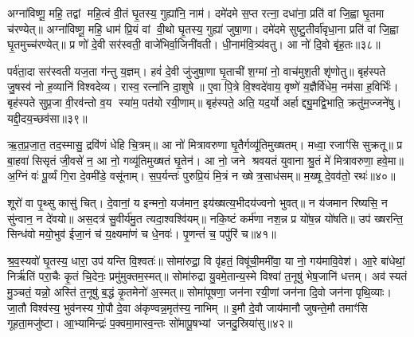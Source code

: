 अग्ना॑विष्णू॒ महि॒ तद्वां महि॒त्वं वी॒तं घृ॒तस्य॒ गुह्या॑नि॒ नाम॑। दमे॑दमे स॒प्त रत्ना॒ दधा॑ना॒ प्रति॑ वां जि॒ह्वा घृ॒तमा च॑रण्येत्॥ अग्ना॑विष्णू॒ महि॒ धाम॑ प्रि॒यं वां वी॒थो घृ॒तस्य॒ गुह्या॑ जुषा॒णा। दमे॑दमे सुष्टु॒तीर्वा॑वृधा॒ना प्रति॑ वां जि॒ह्वा घृ॒तमुच्च॑रण्येत्॥ प्र णो॑ दे॒वी सर॑स्वती॒ वाजे॑भिर्वा॒जिनी॑वती। धी॒नाम॑वि॒त्र्य॑वतु। आ नो॑ दि॒वो बृ॑ह॒तः॥३८॥

पर्व॑ता॒दा सर॑स्वती यज॒ता ग॑न्तु य॒ज्ञम्। हवं॑ दे॒वी जु॑जुषा॒णा घृ॒ताची॑ श॒ग्मां नो॒ वाच॑मुश॒ती शृ॑णोतु॥ बृह॑स्पते जु॒षस्व॑ नो ह॒व्यानि॑ विश्वदेव्य। रास्व॒ रत्ना॑नि दा॒शुषे॥ ए॒वा पि॒त्रे वि॒श्वदे॑वाय॒ वृष्णे॑ य॒ज्ञैर्वि॑धेम॒ नम॑सा ह॒विर्भिः॑। बृह॑स्पते सुप्र॒जा वी॒रव॑न्तो व॒य स्या॑म॒ पत॑यो रयी॒णाम्॥ बृह॑स्पते॒ अति॒ यद॒र्यो अर्\mbox{}हाद्द्यु॒मद्वि॒भाति॒ क्रतु॑म॒ज्जने॑षु। यद्दी॒दय॒च्छव॑सा॥३९॥

ऋ॒त॒प्र॒जा॒त॒ तद॒स्मासु॒ द्रवि॑णं धेहि चि॒त्रम्॥ आ नो॑ मित्रावरुणा घृ॒तैर्गव्यू॑तिमुख्षतम्। मध्वा॒ रजाꣳ॑सि सुक्रतू॥ प्र बा॒हवा॑ सिसृतं जी॒वसे॑ न॒ आ नो॒ गव्यू॑तिमुख्षतं घृ॒तेन॑। आ नो॒ जने श्रवयतं युवाना श्रु॒तं मे॑ मित्रावरुणा॒ हवे॒मा॥ अ॒ग्निं वः॑ पू॒र्व्यं गि॒रा दे॒वमी॑डे॒ वसू॑नाम्। स॒प॒र्यन्तः॑ पुरुप्रि॒यं मि॒त्रं न ख्षेत्र॒साध॑सम्॥ म॒ख्षू दे॒वव॑तो॒ रथः॑॥४०॥

शूरो॑ वा पृ॒थ्सु कासु॑ चित्। दे॒वानां॒ य इन्मनो॒ यज॑मान॒ इय॑ख्षत्य॒भीदय॑ज्वनो भुवत्॥ न य॑जमान रिष्यसि॒ न सु॑न्वान॒ न दे॑वयो॥ अस॒दत्र॑ सु॒वीर्य॑मु॒त त्यदा॒श्वश्वि॑यम्॥ नकि॒ष्टं कर्म॑णा नश॒न्न प्र यो॑ष॒न्न यो॑षति॥ उप॑ ख्षरन्ति॒ सिन्ध॑वो मयो॒भुव॑ ईजा॒नं च॑ य॒क्ष्यमा॑णं च धे॒नवः॑। पृ॒णन्तं॑ च॒ पपु॑रिं च॥४१॥

श्र॒व॒स्यवो॑ घृ॒तस्य॒ धारा॒ उप॑ यन्ति वि॒श्वतः॑॥ सोमा॑रुद्रा॒ वि वृ॑हतं॒ विषू॑ची॒ममी॑वा॒ या नो॒ गय॑मावि॒वेश॑। आ॒रे बा॑धेथां॒ निर्\mbox{}ऋ॑तिं परा॒चैः कृ॒तं चि॒देनः॒ प्रमु॑मुक्तम॒स्मत्॥ सोमा॑रुद्रा यु॒वमे॒तान्य॒स्मे विश्वा॑ त॒नूषु॑ भेष॒जानि॑ धत्तम्। अव॑ स्यतं मु॒ञ्चतं॒ यन्नो॒ अस्ति॑ त॒नूषु॑ ब॒द्धं कृ॒तमेनो॑ अ॒स्मत्॥ सोमा॑पूषणा॒ जन॑ना रयी॒णां जन॑ना दि॒वो जन॑ना पृथि॒व्याः। जा॒तौ विश्व॑स्य॒ भुव॑नस्य गो॒पौ दे॒वा अ॑कृण्वन्न॒मृत॑स्य॒ नाभिम्॥ इ॒मौ दे॒वौ जाय॑मानौ जुषन्ते॒मौ तमाꣳ॑सि गूहता॒मजु॑ष्टा। आ॒भ्यामिन्द्रः॑ प॒क्वमा॒मास्व॒न्तः सो॑मापू॒षभ्यां जनदु॒स्रिया॑सु॥४२॥

{\anuvakamend[{बृ॒ह॒तः शव॑सा॒ रथः॒ पपु॑रिं च दि॒वो जन॑ना॒ पञ्च॑विशतिश्च॥22॥}]}


{}

